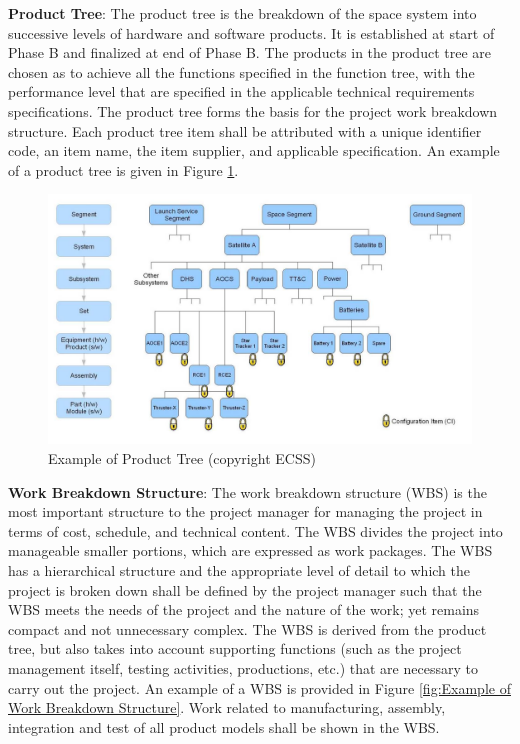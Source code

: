 \textbf{Product Tree}: The product tree is the breakdown of the space system into successive levels of hardware and software products. It is established at start of Phase B and finalized at end of Phase B. The products in the product tree are chosen as to achieve all the functions specified in the function tree, with the performance level that are specified in the applicable technical requirements specifications. The product tree forms the basis for the project work breakdown structure. Each product tree item shall be attributed with a unique identifier code, an item name, the item supplier, and applicable specification. An example of a product tree is given in Figure \ref{fig:Example of Product Tree}. 

\begin{figure}[h]
\centering\includegraphics[scale=0.3]{fig/example_of_product_tree}
\caption{Example of Product Tree (copyright ECSS)}
\label{fig:Example of Product Tree}
\end{figure}

\textbf{Work Breakdown Structure}: The work breakdown structure (WBS) is the most important structure to the project manager for managing the project in terms of cost, schedule, and technical content. The WBS divides the project into manageable smaller portions, which are expressed as work packages. The WBS has a hierarchical structure and the appropriate level of detail to which the project is broken down shall be defined by the project manager such that the WBS meets the needs of the project and the nature of the work; yet remains compact and not unnecessary complex. The WBS is derived from the product tree, but also takes into account supporting functions (such as the project management itself, testing activities, productions, etc.) that are necessary to carry out the project. An example of a WBS is provided in Figure \ref{fig:Example of Work Breakdown Structure}. Work related to manufacturing, assembly, integration and test of all product models shall be shown in the WBS.

